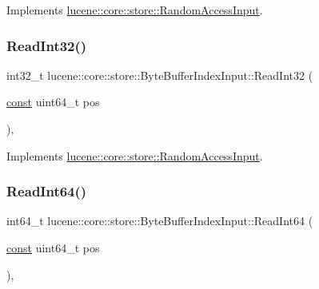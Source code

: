 Implements \mbox{\hyperlink{classlucene_1_1core_1_1store_1_1RandomAccessInput_ae2310d2e4250a14c33c3e24d18a13b68}{lucene\+::core\+::store\+::\+Random\+Access\+Input}}.

\mbox{\label{classlucene_1_1core_1_1store_1_1ByteBufferIndexInput_a4d633d98060b140f8e416c3178ae842f}} 
\subsubsection{\texorpdfstring{Read\+Int32()}{ReadInt32()}}
{\footnotesize\ttfamily int32\+\_\+t lucene\+::core\+::store\+::\+Byte\+Buffer\+Index\+Input\+::\+Read\+Int32 (\begin{DoxyParamCaption}\item[{\mbox{\hyperlink{ZlibCrc32_8h_a2c212835823e3c54a8ab6d95c652660e}{const}} uint64\+\_\+t}]{pos }\end{DoxyParamCaption})\hspace{0.3cm}{\ttfamily [inline]}, {\ttfamily [virtual]}}



Implements \mbox{\hyperlink{classlucene_1_1core_1_1store_1_1RandomAccessInput_a3deffb5fe76279f2632b9aee859680a8}{lucene\+::core\+::store\+::\+Random\+Access\+Input}}.

\mbox{\label{classlucene_1_1core_1_1store_1_1ByteBufferIndexInput_a7d3a10f0f6a68cc86d6737d457d4d45f}} 
\subsubsection{\texorpdfstring{Read\+Int64()}{ReadInt64()}}
{\footnotesize\ttfamily int64\+\_\+t lucene\+::core\+::store\+::\+Byte\+Buffer\+Index\+Input\+::\+Read\+Int64 (\begin{DoxyParamCaption}\item[{\mbox{\hyperlink{ZlibCrc32_8h_a2c212835823e3c54a8ab6d95c652660e}{const}} uint64\+\_\+t}]{pos }\end{DoxyParamCaption})\hspace{0.3cm}{\ttfamily [inline]}, {\ttfamily [virtual]}}



